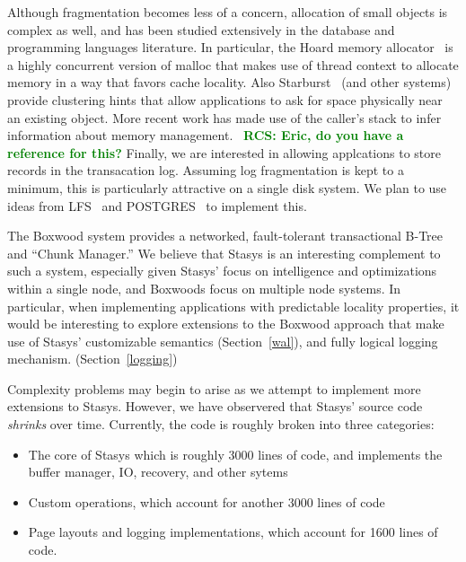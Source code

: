 \documentclass[letterpaper,twocolumn,10pt]{article}
\newcommand{\yad}{Stasys\xspace}
\newcommand{\yads}{Stasys'\xspace}
\newcommand{\rcs}[1]{\textcolor{green}{\bf RCS: #1}}
\begin{document}
Although fragmentation becomes less of a concern, allocation of small
objects is complex as well, and has been studied extensively in the
database and programming languages literature.  In particular, the
Hoard memory allocator~\cite{hoard} is a highly concurrent version of
malloc that makes use of thread context to allocate memory in a way
that favors cache locality.  Also Starburst~\cite{starburst} (and
other systems) provide clustering hints that allow applications to ask
for space physically near an existing object.  More recent work has
made use of the caller's stack to infer information about memory
management.~\cite{xxx} \rcs{Eric, do you have a reference for this?}
Finally, we are interested in allowing applcations to store records in
the transacation log.  Assuming log fragmentation is kept to a
minimum, this is particularly attractive on a single disk system.  We
plan to use ideas from LFS~\cite{lfs} and POSTGRES~\cite{postgres}
to implement this.

The Boxwood system provides a networked, fault-tolerant transactional
B-Tree and ``Chunk Manager.''  We believe that \yad is an interesting
complement to such a system, especially given \yads focus on
intelligence and optimizations within a single node, and Boxwoods
focus on multiple node systems.  In particular, when implementing
applications with predictable locality properties, it would be
interesting to explore extensions to the Boxwood approach that make
use of \yads customizable semantics (Section~\ref{wal}), and fully logical logging
mechanism. (Section~\ref{logging})

Complexity problems may begin to arise as we attempt to implement more
extensions to \yad.  However, we have observered that \yads source
code {\em shrinks} over time.  Currently, the code is roughly broken
into three categories:
\begin{itemize}
\item The core of \yad which is roughly 3000 lines
of code, and implements the buffer manager, IO, recovery, and other
sytems
\item Custom operations, which account for another 3000 lines of code
\item Page layouts and logging implementations, which account for 1600 lines of code.
\end{itemize}
\end{document}
